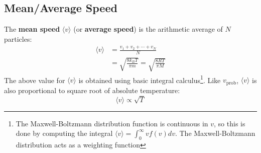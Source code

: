 \subsection{Mean/Average Speed}
%  
%    
The \textbf{mean speed} $\langle v\rangle$ (or \textbf{average speed}) is
the arithmetic average of $N$ particles:
\begin{align*}
  \langle v\rangle &=\frac{v_1+v_2+\cdots+v_N}N\\
  &=\sqrt{\frac{8k_BT}{\pi m}}=\sqrt{\frac{8RT}{\pi M}}
\end{align*}
The above value for $\langle v\rangle$ is obtained using basic integral
calculus\footnote{The Maxwell-Boltzmann distribution function is continuous
in $v$, so this is done by computing the integral
$\langle v\rangle=\int_0^\infty vf(v)dv$. The Maxwell-Boltzmann distribution
acts as a weighting function}. Like $v_\text{prob}$, $\langle v\rangle$ is
also proportional to square root of absolute temperature:
\begin{equation}
  \langle v\rangle\propto\sqrt T
\end{equation}
%
%
%
%
%
%
%      
%
%
%
%
%
%
%
%
%
%
%
%
